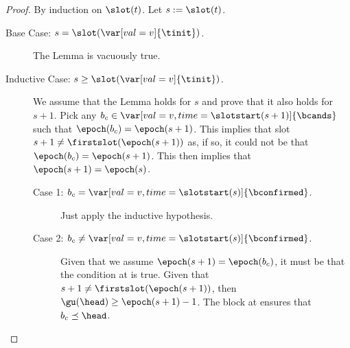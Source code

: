 \documentclass{article}
\begin{document}
\begin{proof}
    By induction on $\slot(t)$.
    Let $s := \slot(t)$.
    \begin{description}
        \item[Base Case: {$s = \slot(\var[val=v]{\tinit})$}.] The Lemma is vacuously true.
        \item[Inductive Case: {$s \geq \slot(\var[val=v]{\tinit})$}.] We assume that the Lemma holds for $s$ and prove that it also holds for $s+1$.
        Pick any $b_c \in  \var[val=v,time=\slotstart(s+1)]{\bcands}$ such that $\epoch(b_c) = \epoch(s+1)$.
        This implies that slot $s+1 \neq \firstslot(\epoch(s+1))$ as, if so, it could not be that  $\epoch(b_c) = \epoch(s+1)$.
        This then implies that  $\epoch(s+1) = \epoch(s)$.
        \begin{description}
            \item[Case 1: {$b_c = \var[val=v,time=\slotstart(s)]{\bconfirmed}$}.]
            Just apply the inductive hypothesis.
            \item[Case 2: {$b_c \neq \var[val=v,time=\slotstart(s)]{\bconfirmed}$}.]
            Given that we assume $\epoch(s+1) = \epoch(b_c)$, it must be that the  condition at  is true.
            Given that  $s+1 \neq \firstslot(\epoch(s+1))$, then $\gu(\head) \geq \epoch(s+1)-1$.
            The  block at  ensures that $b_c \preceq \head$.
        \end{description}
    \end{description}
\end{proof}

\end{document}
